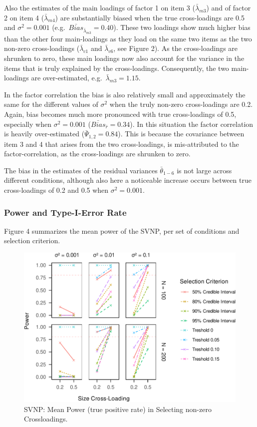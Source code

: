 \documentclass[
  man, donotrepeattitle,floatsintext]{apa6}
\begin{document}
Also the estimates of the main loadings of factor 1 on item 3 (\(\bar{\lambda}_{m 3}\)) and of factor 2 on item 4 (\(\bar{\lambda}_{m 4}\)) are substantially biased when the true cross-loadings are 0.5 and \(\sigma^2 = 0.001\) (e.g.~\(\bar{Bias}_{\bar{\lambda}_{m 3}} = 0.40\)). These two loadings show much higher bias than the other four main-loadings as they load on the same two items as the two non-zero cross-loadings (\(\bar{\lambda}_{c 1}\) and \(\bar{\lambda}_{c 6}\), see Figure 2). As the cross-loadings are shrunken to zero, these main loadings now also account for the variance in the items that is truly explained by the cross-loadings. Consequently, the two main-loadings are over-estimated, e.g.~\(\bar{\lambda}_{m 3} = 1.15\).

In the factor correlation the bias is also relatively small and approximately the same for the different values of \(\sigma^2\) when the truly non-zero cross-loadings are 0.2. Again, bias becomes much more pronounced with true cross-loadings of 0.5, especially when \(\sigma^2 = 0.001\) (\(\bar{Bias}_{\bar{r}} = 0.34\)). In this situation the factor correlation is heavily over-estimated (\(\bar{\Psi}_{1,2} = 0.84\)). This is because the covariance between item 3 and 4 that arises from the two cross-loadings, is mis-attributed to the factor-correlation, as the cross-loadings are shrunken to zero.

The bias in the estimates of the residual variances \(\bar{\theta}_{1-6}\) is not large across different conditions, although also here a noticeable increase occurs between true cross-loadings of 0.2 and 0.5 when \(\sigma^2 = 0.001\).

\hypertarget{power-and-type-i-error-rate-1}{%
\subsubsection{Power and Type-I-Error Rate}\label{power-and-type-i-error-rate-1}}

Figure 4 summarizes the mean power of the SVNP, per set of conditions and selection criterion.

\begin{figure}
\centering
\includegraphics{JMBKoch_thesis_files/figure-latex/unnamed-chunk-4-1.pdf}
\caption{\label{fig:unnamed-chunk-4}SVNP: Mean Power (true positive rate) in Selecting non-zero Crossloadings.}
\end{figure}
\end{document}
